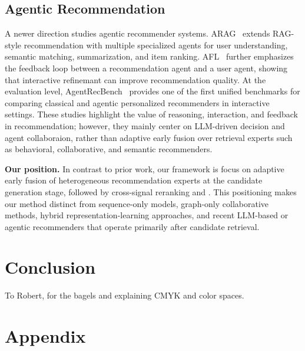 \documentclass[sigconf,anonymous]{acmart}
\begin{document}
\subsection{Agentic Recommendation}
A newer direction studies agentic recommender systems. ARAG~\cite{arag} extends RAG-style recommendation with multiple specialized agents for user understanding, semantic matching, summarization, and item ranking. AFL~\cite{afl} further emphasizes the feedback loop between a recommendation agent and a user agent, showing that interactive refinemant can improve recommendation quality. At the evaluation level, AgentRecBench~\cite{agentrecbench} provides one of the first unified benchmarks for comparing classical and agentic personalized recommenders in interactive settings. These studies highlight the value of reasoning, interaction, and feedback in recommendation; however, they mainly center on LLM-driven decision and agent collaboraion, rather than adaptive early fusion over retrieval experts such as behavioral, collaborative, and semantic recommenders.

\noindent\textbf{Our position.}
In contrast to prior work, our framework is focus on adaptive early fusion of heterogeneous recommendation experts at the candidate generation stage, followed by cross-signal reranking and . This positioning makes our method distinct from sequence-only models, graph-only collaborative methods, hybrid representation-learning approaches, and recent LLM-based or agentic recommenders that operate primarily after candidate retrieval.

\section{Conclusion}


\begin{acks}
To Robert, for the bagels and explaining CMYK and color spaces.
\end{acks}





\appendix

\section{Appendix}
\end{document}
